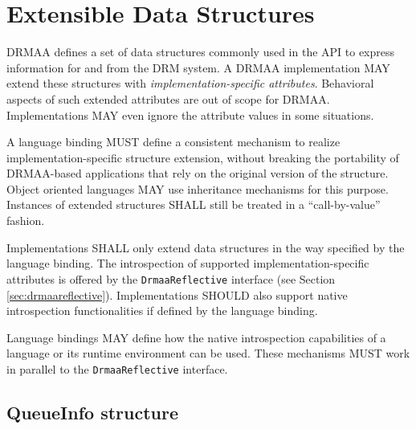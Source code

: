 \documentclass{article}
\newcommand{\h}[1]{\lstinline|#1|}
\newcommand{\langbind}[1]{\begin{shaded}#1\end{shaded}}
\newcommand{\rat}[1]{}
\begin{document}
\section{Extensible Data Structures}
\label{sec:structextension}

DRMAA defines a set of data structures commonly used in the API to express information for and from the DRM system. A DRMAA implementation MAY extend these structures with \emph{implementation-specific attributes}. Behavioral aspects of such extended attributes are out of scope for DRMAA. Implementations MAY even ignore the attribute values in some situations.

\langbind{
A language binding MUST define a consistent mechanism to realize implementation-specific structure extension, without breaking the portability of DRMAA-based applications that rely on the original version of the structure. Object oriented languages MAY use inheritance mechanisms for this purpose. Instances of extended structures SHALL still be treated in a \enquote{call-by-value} fashion. 
}

Implementations SHALL only extend data structures in the way specified by the language binding. The introspection of supported implementation-specific attributes is offered by the \h{DrmaaReflective} interface (see Section \ref{sec:drmaareflective}). Implementations SHOULD also support native introspection functionalities if defined by the language binding.

\langbind{
Language bindings MAY define how the native introspection capabilities of a language or its runtime environment can be used. These mechanisms MUST work in parallel to the \h{DrmaaReflective} interface.
}

\rat{
Comparison to DRMAA 1.0: The binding of job template attribute names and exception names to strings was removed. Language bindings have to define their own mapping, if needed. 

One example for native language introspection support could be attributes.

There was a discussion to remove the attribute ignorance possibility for implementations, in order to have a defined error when unknown attributes are used. This was rejected on the Apr. 13th conf call, since applications do not need the error as indication for missing attribute support. Instead, they should use the given introspection capabilities.
}

\subsection{QueueInfo structure}
\label{sec:queue}
\end{document}
